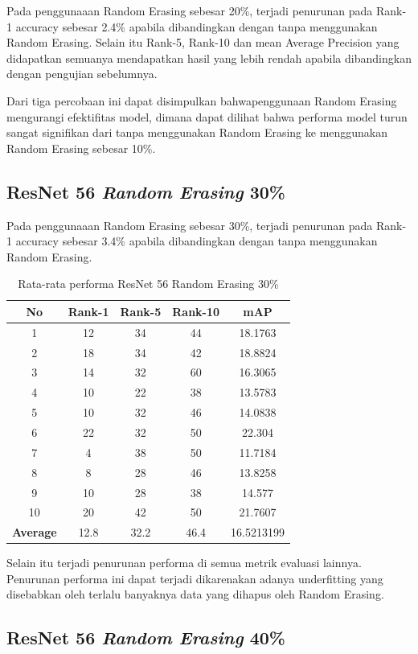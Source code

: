 Pada penggunaaan Random Erasing sebesar 20\%, terjadi penurunan pada Rank-1 accuracy sebesar 2.4\% apabila dibandingkan dengan tanpa menggunakan Random Erasing. Selain itu Rank-5, Rank-10 dan mean Average Precision yang didapatkan semuanya mendapatkan hasil yang lebih rendah apabila dibandingkan dengan pengujian sebelumnya. 

Dari tiga percobaan ini dapat disimpulkan bahwapenggunaan Random Erasing mengurangi efektifitas model, dimana dapat dilihat bahwa performa model turun sangat signifikan dari tanpa menggunakan Random Erasing ke menggunakan Random Erasing sebesar 10\%.

\subsection{ResNet 56 \textit{Random Erasing} 30\%}

Pada penggunaaan Random Erasing sebesar 30\%, terjadi penurunan pada Rank-1 accuracy sebesar 3.4\% apabila dibandingkan dengan tanpa menggunakan Random Erasing.

\begin{longtable}{|c|c|c|c|c|}
	\caption{Rata-rata performa ResNet 56 Random Erasing 30\%}
	\label{tabel: 33}\\
	\hline
	\rowcolor[HTML]{C0C0C0}
	\textbf{No} &\textbf{Rank-1} & \textbf{Rank-5} & \textbf{Rank-10} & \textbf{mAP} \\
	\hline
	1 &12 &34 &44 &18.1763 \\
	2 &18 &34 &42 &18.8824 \\
	3 &14 &32 &60 &16.3065 \\
	4 &10 &22 &38 &13.5783 \\
	5 &10 &32 &46 &14.0838 \\
	6 &22 &32 &50 &22.304 \\
	7 &4 &38 &50 &11.7184 \\
	8 &8 &28 &46 &13.8258 \\
	9 &10 &28 &38 &14.577 \\
	10 &20 &42 &50 &21.7607 \\
	\hline
	\textbf{Average} & 12.8 & 32.2 & 46.4 &16.5213199 \\
	\hline
\end{longtable}
Selain itu terjadi penurunan performa di semua metrik evaluasi lainnya. Penurunan performa ini dapat terjadi dikarenakan adanya underfitting yang disebabkan oleh terlalu banyaknya data yang dihapus oleh Random Erasing.

\subsection{ResNet 56 \textit{Random Erasing} 40\%}

